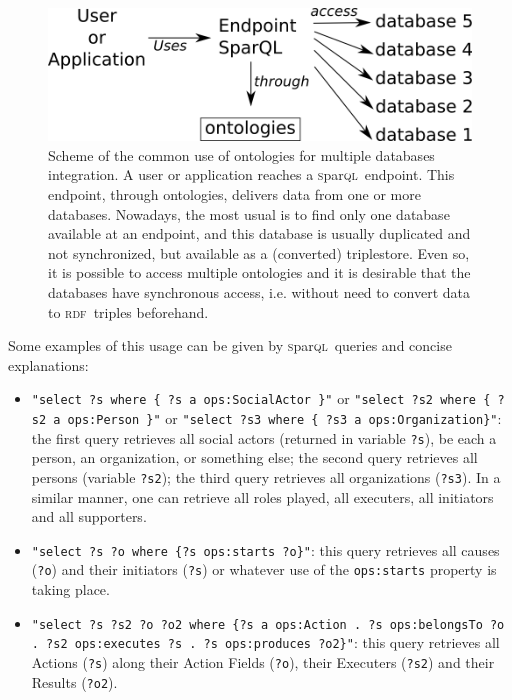 \documentclass[10pt,letterpaper]{article}
\newcommand{\sparql}{\textsc{s}par\textsc{ql}}
\newcommand{\rdf}{\textsc{rdf}}
\begin{document}
\begin{figure}[!h]
    \centering
        \includegraphics[width=0.9\columnwidth]{figs/endpoint}
    \caption{Scheme of the common use of ontologies for multiple databases integration.
    A user or application reaches a \sparql\ endpoint.
    This endpoint, through ontologies, delivers data from one or more databases.
    Nowadays, the most usual is to find only one database available at an endpoint,
    and this database is usually duplicated and not synchronized,
    but available as a (converted) triplestore.
    Even so,
    it is possible to access multiple ontologies and it is desirable that the databases have synchronous access,
    i.e. without need to convert data to \rdf\ triples beforehand.}
    \label{endpoint}
\end{figure}

Some examples of this usage can be given by \sparql\ queries and concise explanations:
\begin{itemize}
    \item \texttt{"select ?s where \{ ?s a ops:SocialActor \}"} or
    \texttt{"select ?s2 where \{ ?s2 a ops:Person \}"} or
    \texttt{"select ?s3 where \{ ?s3 a ops:Organization\}"}:
    the first query retrieves all social actors (returned in variable \texttt{?s}),
    be each a person, an organization, or something else;
    the second query retrieves all persons (variable \texttt{?s2});
    the third query retrieves all organizations (\texttt{?s3}).
    In a similar manner, one can retrieve all roles played, all executers, all initiators and all supporters.
    \item \texttt{"select ?s ?o where \{?s ops:starts ?o\}"}:
    this query retrieves all causes ({\tt ?o}) and their initiators ({\tt ?s})
    or whatever use of the {\tt ops:starts} property is taking place.
    \item \texttt{"select ?s ?s2 ?o ?o2 where \{?s a ops:Action . ?s ops:belongsTo ?o . ?s2 ops:executes ?s . ?s ops:produces ?o2\}"}:
    this query retrieves all Actions (\texttt{?s}) along their Action Fields (\texttt{?o}),
    their Executers (\texttt{?s2}) and their Results (\texttt{?o2}).
\end{itemize}
\end{document}
